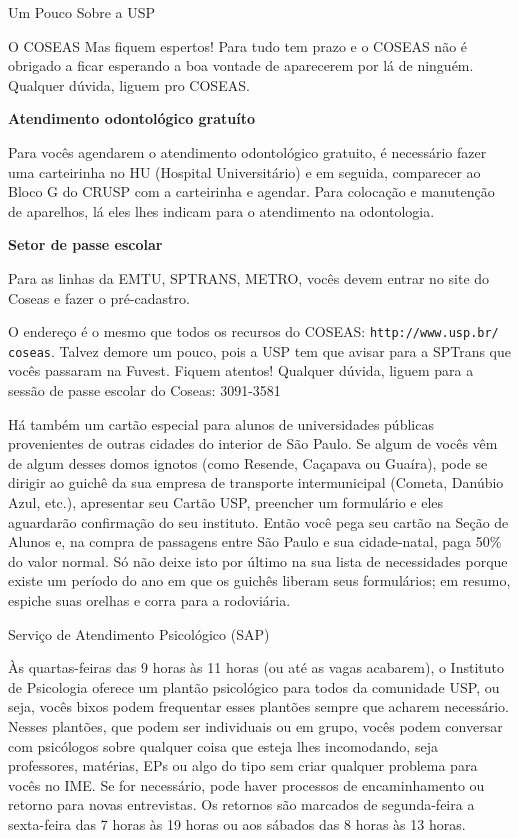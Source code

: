 \begin{secao}{Um Pouco Sobre a USP}
\begin{subsecao}{O COSEAS}
Mas fiquem espertos! Para tudo tem prazo e o COSEAS não é obrigado a ficar esperando a
boa vontade de aparecerem por lá de ninguém. Qualquer dúvida, liguem pro COSEAS.

{\bf Atendimento odontológico gratuíto}

Para vocês agendarem o atendimento odontológico gratuito, é necessário fazer uma
carteirinha no HU (Hospital Universitário) e em seguida, comparecer ao Bloco G
do CRUSP com a carteirinha e agendar. Para colocação e manutenção de aparelhos,
lá eles lhes indicam para o atendimento na odontologia. 

{\bf Setor de passe escolar}

Para as linhas da EMTU, SPTRANS, METRO, vocês devem entrar no site do Coseas e fazer
o pré-cadastro. 

O endereço é o mesmo que todos os recursos do COSEAS: {\tt http://www.usp.br/
coseas}. Talvez demore um pouco, pois a USP tem que avisar para a SPTrans que vocês
passaram na Fuvest. Fiquem atentos! Qualquer dúvida, liguem para a sessão de passe 
escolar do Coseas: 3091-3581 

Há também um cartão especial para alunos de universidades públicas provenientes
de outras cidades do interior de São Paulo. Se algum de vocês vêm de algum desses domos 
ignotos (como Resende, Caçapava ou Guaíra), pode se dirigir ao guichê da sua empresa de
transporte intermunicipal (Cometa, Danúbio Azul, etc.), apresentar seu Cartão USP,
preencher um formulário e eles aguardarão confirmação do seu instituto. Então
você pega seu cartão na Seção de Alunos e, na compra de passagens entre São Paulo
e sua cidade-natal, paga 50\% do valor normal. Só não deixe isto por último na
sua lista de necessidades porque existe um período do ano em que os guichês
liberam seus formulários; em resumo, espiche suas orelhas e corra para a rodoviária.

\end{subsecao}

\begin{subsecao}{Serviço de Atendimento Psicológico (SAP)}

Às quartas-feiras das 9 horas às 11 horas (ou até as vagas acabarem),
o Instituto de Psicologia oferece um plantão psicológico para todos da
comunidade USP, ou seja, vocês bixos podem frequentar esses plantões sempre
que acharem necessário. Nesses plantões, que podem ser individuais ou em 
grupo, vocês podem conversar com psicólogos sobre qualquer coisa que esteja lhes
incomodando, seja professores, matérias, EPs ou algo do tipo sem criar qualquer
problema para vocês no IME. Se for necessário, pode haver processos de
encaminhamento ou retorno para novas entrevistas. Os retornos são marcados de
segunda-feira a sexta-feira das 7 horas às 19 horas ou aos sábados das
8 horas às 13 horas.


\end{subsecao}
\end{secao}
